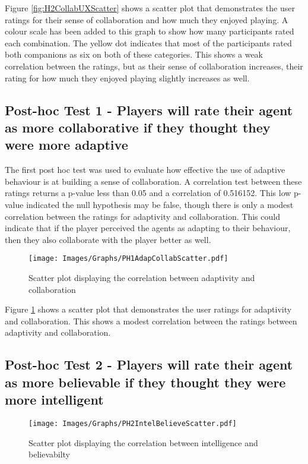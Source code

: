 \documentclass{IEEEtran}
\begin{document}
Figure \ref{fig:H2CollabUXScatter} shows a scatter plot that demonstrates the user ratings for their sense of collaboration and how much they enjoyed playing. A colour scale has been added to this graph to show how many participants rated each combination. The yellow dot indicates that most of the participants rated both companions as six on both of these categories. This shows a weak correlation between the ratings, but as their sense of collaboration increases, their rating for how much they enjoyed playing slightly increases as well.

\subsection{Post-hoc Test 1 - Players will rate their agent as more collaborative if they thought they were more adaptive}

The first post hoc test was used to evaluate how effective the use of adaptive behaviour is at building a sense of collaboration. A correlation test between these ratings returns a p-value less than 0.05 and a correlation of 0.516152. This low p-value indicated the null hypothesis may be false, though there is only a modest correlation between the ratings for adaptivity and collaboration. This could indicate that if the player perceived the agents as adapting to their behaviour, then they also collaborate with the player better as well.

\begin{figure}[!h]
  \centering
  \texttt{[image: Images/Graphs/PH1AdapCollabScatter.pdf]}
  
\caption{Scatter plot displaying the correlation between adaptivity and collaboration}
\label{fig:PH1AdapCollabScatter}
\end{figure}

Figure \ref{fig:PH1AdapCollabScatter} shows a scatter plot that demonstrates the user ratings for adaptivity and collaboration. This shows a modest correlation between the ratings between adaptivity and collaboration.

\subsection{Post-hoc Test 2 - Players will rate their agent as more believable if they thought they were more intelligent}

\begin{figure}[!h]
  \centering
  \texttt{[image: Images/Graphs/PH2IntelBelieveScatter.pdf]}
  
\caption{Scatter plot displaying the correlation between intelligence and believabilty}
\label{fig:PH2IntelBelieveScatter}
\end{figure}
\end{document}
